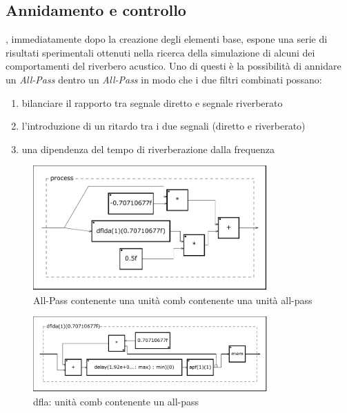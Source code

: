 \subsection{Annidamento e controllo}

\ms, immediatamente dopo la creazione degli elementi base, espone una serie di
risultati sperimentali ottenuti nella ricerca della simulazione di alcuni dei
comportamenti del riverbero acustico. Uno di questi è la possibilità di annidare
un \emph{All-Pass} dentro un \emph{All-Pass} in modo che i due filtri combinati
possano:
\begin{enumerate}
  \item bilanciare il rapporto tra segnale diretto e segnale riverberato
  \item l'introduzione di un ritardo tra i due segnali (diretto e riverberato)
  \item una dipendenza del tempo di riverberazione dalla frequenza
\end{enumerate}



\begin{figure}[htp]
\centering
\includegraphics[width=0.80\textwidth]{Code/msapfdwp-svg/process.pdf}
\caption{All-Pass contenente una unità comb contenente una unità all-pass}
\label{fig:apfdwp}
\end{figure}

\begin{figure}[htp]
\centering
\includegraphics[width=0.80\textwidth]{Code/msapfdwp-svg/dflda-0x600001c847e0.pdf}
\caption{dfla: unità comb contenente un all-pass}
\label{fig:dfla}
\end{figure}

